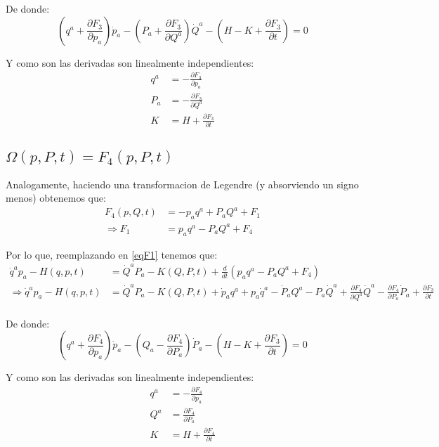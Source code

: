 \documentclass[paper=a4, fontsize=11pt,twoside]{scrartcl}
\begin{document}
De donde:
	\begin{equation*}
		\left(q^{a} + \frac{\partial F_{3}}{\partial p_{a}} \right)\dot{p}_{a}
	   -\left( P_{a} +\frac{\partial F_{3}}{\partial Q^{a}} \right)\dot{Q}^{a}
	   - \left(H - K + \frac{\partial F_{3}}{\partial t}\right)  = 0
	\end{equation*}

Y como son las derivadas son linealmente independientes:
	\begin{align*}
		q^{a} &= -\frac{\partial F_{3}}{\partial p_{a}}\\
		P_{a} &= -\frac{\partial F_{3}}{\partial Q^{a}} \\
		K &= H + \frac{\partial F_{3}}{\partial t}
	\end{align*}

\subsection{$\Omega(p,P,t) = F_{4}(p,P,t)$}

Analogamente, haciendo una transformacion de Legendre (y absorviendo un signo menos) obtenemos que:
	\begin{align*}
		F_{4}(p,Q,t) &= -p_{a}q^{a}+P_{a}Q^{a} + F_{1} \\
		\Rightarrow F_{1} &= p_{a}q^{a} - P_{a}Q^{a} + F_{4}
	\end{align*}
	
Por lo que, reemplazando en \eqref{eqF1} tenemos que:
	\begin{align*}
		\dot{q}^{a}p_{a} - H(q,p,t) &=  \dot{Q}^{a}P_{a} - K(Q,P,t)  + \frac{d}{dt} \left( p_{a}q^{a} - P_{a}Q^{a} + F_{4} \right) \\ \label{eqF1}
\Rightarrow \dot{q}^{a}p_{a} - H(q,p,t) &=  \dot{Q}^{a}P_{a} - K(Q,P,t)  + \dot{p}_{a}q^{a} + p_{a}\dot{q}^{a}
										   - \dot{P}_{a}Q^{a} - P_{a}\dot{Q}^{a}
										   +\frac{\partial F_{4}}{\partial Q^{a}}\dot{Q}^{a} 
										   -\frac{\partial F_{4}}{\partial P_{a}}\dot{P}_{a} + \frac{\partial F_{3}}{\partial t}\\
	\end{align*}
	
De donde:
	\begin{equation*}
		\left(q^{a} + \frac{\partial F_{4}}{\partial p_{a}} \right)\dot{p}_{a}
	   -\left( Q_{a} -\frac{\partial F_{4}}{\partial P_{a}} \right)\dot{P}_{a}
	   - \left(H - K + \frac{\partial F_{3}}{\partial t}\right)  = 0
	\end{equation*}

Y como son las derivadas son linealmente independientes:
	\begin{align*}
		q^{a} &= -\frac{\partial F_{4}}{\partial p_{a}}\\
		Q^{a} &= \frac{\partial F_{4}}{\partial P_{a}} \\
		K &= H + \frac{\partial F_{4}}{\partial t}
	\end{align*}
\end{document}
